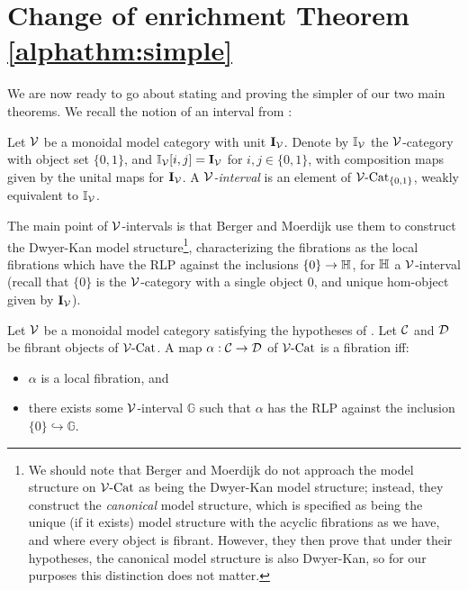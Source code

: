\documentclass[12pt]{amsart}
\begin{document}
\section{Change of enrichment Theorem \ref{alphathm:simple}}\label{section:thmA}
We are now ready to go about stating and proving the simpler of our two main theorems.
\noindent We recall the notion of an interval from \cite{BergerMoerdijk2012}:
\begin{definition}\label{dfn:interval-berger-moerdijk}
	Let $\mathcal{V}$ be a monoidal model category with unit $\mathbf{I}_\mathcal{V}$. 
	Denote by $\mathbb{I}_\mathcal{V}$ the $\mathcal{V}$-category with object set $\{0, 1\}$, and $\mathbb{I}_\mathcal{V}[i,j] = \mathbf{I}_\mathcal{V}$ for $i,j \in \{0,1\}$, with composition maps given by the unital maps for $\mathbf{I}_\mathcal{V}$. 
	A \emph{$\mathcal{V}$-interval} is an element of $\mathcal{V}\text{-}\mathrm{Cat}_{\{0,1\}}$, weakly equivalent to $\mathbb{I}_\mathcal{V}$. 
\end{definition}
The main point of $\mathcal{V}$-intervals is that Berger and Moerdijk use them to construct the Dwyer-Kan model structure\footnote{
	We should note that Berger and Moerdijk do not approach the model structure on $\mathcal{V}\text{-}\mathrm{Cat}$ as being the Dwyer-Kan model structure; instead, they construct the \textit{canonical} model structure, which is specified as being the unique (if it exists) model structure with the acyclic fibrations as we have, and where every object is fibrant. 
	However, they then prove that under their hypotheses, the canonical model structure is also Dwyer-Kan, so for our purposes this distinction does not matter.
}, characterizing the fibrations as the local fibrations which have the RLP against the inclusions $\{0\} \to \mathbb{H}$, for $\mathbb{H}$ a $\mathcal{V}$-interval (recall that $\{0\}$ is the $\mathcal{V}$-category with a single object $0$, and unique hom-object given by $\mathbf{I}_\mathcal{V}$).
\begin{lemma}\label{lem:single-interval-fibrant-objects}
	Let $\mathcal{V}$ be a monoidal model category satisfying the hypotheses of \cite[Theorem 1.10]{BergerMoerdijk2012}.
	Let $\mathcal{C}$ and $\mathcal{D}$ be fibrant objects of $\mathcal{V}\text{-}\mathrm{Cat}$. A map $\alpha: \mathcal{C} \to \mathcal{D}$ of $\mathcal{V}\text{-}\mathrm{Cat}$ is a fibration iff: 
	\begin{itemize}
		\item $\alpha$ is a local fibration, and
		\item there exists some $\mathcal{V}$-interval $\mathbb{G}$ such that $\alpha$ has the RLP against the inclusion $\{0\} \hookrightarrow \mathbb{G}$. 
	\end{itemize}
\end{lemma}
\end{document}
